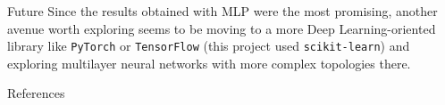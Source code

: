 \documentclass[final]{beamer}
\newlength{\sepwidth}
\newlength{\colwidth}
\newcommand{\separatorcolumn}{\begin{column}{\sepwidth}\end{column}}
\begin{document}
\begin{frame}[t]
\begin{columns}[t]
\begin{column}{\colwidth}
\begin{block}{Future}
    Since the results obtained with MLP were the most promising, another avenue worth exploring seems to be moving to a more Deep Learning-oriented library like \texttt{PyTorch} or \texttt{TensorFlow} (this project used \texttt{scikit-learn}) and exploring multilayer neural networks with more complex topologies there.

  \end{block}

  \begin{block}{References}

    \nocite{*}
    \tiny{}

  \end{block}

\end{column}

\separatorcolumn
\end{columns}
\end{frame}
\end{document}
